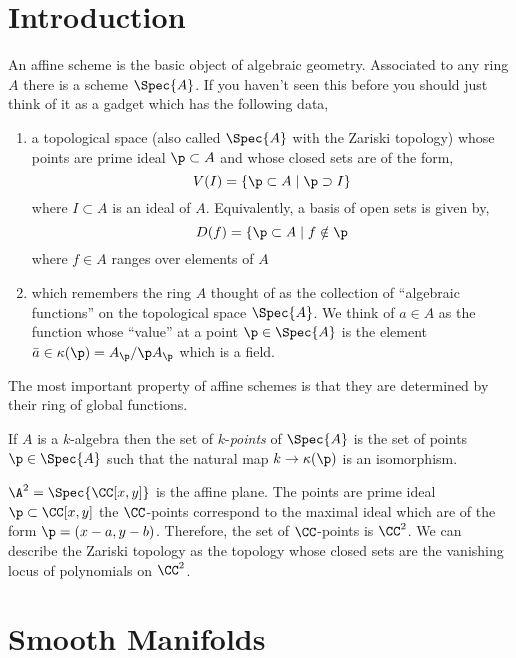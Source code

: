 \documentclass[12pt]{article}
\begin{document}
\section{Introduction}

An affine scheme is the basic object of algebraic geometry. Associated to any ring $A$ there is a scheme $\Spec{A}$. If you haven't seen this before you should just think of it as a gadget which has the following data,
\begin{enumerate}
\item a topological space (also called $\Spec{A}$ with the Zariski topology) whose points are prime ideal $\p \subset A$ and whose closed sets are of the form,
\[ V(I) = \{ \p \subset A \mid \p \supset I \} \]
where $I \subset A$ is an ideal of $A$. Equivalently, a basis of open sets is given by,
\[ D(f) = \{ \p \subset A \mid f \notin \p \] 
where $f \in A$ ranges over elements of $A$

\item which remembers the ring $A$ thought of as the collection of ``algebraic functions'' on the topological space $\Spec{A}$. We think of $a \in A$ as the function whose ``value'' at a point $\p \in \Spec{A}$ is the element $\bar{a} \in \kappa(\p) = A_\p / \p A_\p$ which is a field. 
\end{enumerate}
The most important property of affine schemes is that they are determined by their ring of global functions.



\begin{defn}
If $A$ is a $k$-algebra then the set of $k$-\textit{points} of $\Spec{A}$ is the set of points $\p \in \Spec{A}$ such that the natural map $k \to \kappa(\p)$ is an isomorphism. 
\end{defn}

\begin{example}
$\A^2 = \Spec{\CC[x,y]}$ is the affine plane. The points are prime ideal $\p \subset \CC[x,y]$ the $\CC$-points correspond to the maximal ideal which are of the form $\p = (x-a,y-b)$. Therefore, the set of $\CC$-points is $\CC^2$. We can describe the Zariski topology as the topology whose closed sets are the vanishing locus of polynomials on $\CC^2$. 
\end{example}


\section{Smooth Manifolds}
\end{document}

